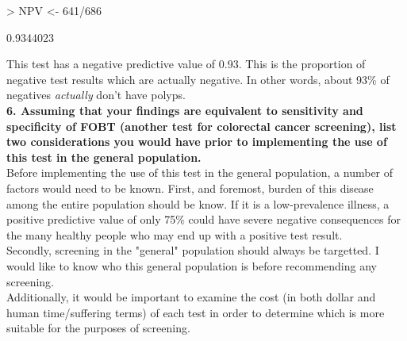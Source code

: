 \documentclass[12pt]{article}
\begin{document}
\begin{Schunk}
\begin{Sinput}
> NPV <- 641/686
\end{Sinput}
\begin{Soutput}
[1] 0.9344023
\end{Soutput}
\end{Schunk}

This test has a negative predictive value of 0.93.  This is the proportion of negative test results which are actually negative.  In other words, about 93\% of negatives \emph{actually} don't have polyps.\\

\noindent \textbf{6. Assuming that your findings are equivalent to sensitivity and specificity of FOBT (another test for colorectal cancer screening), list two considerations you would have prior to implementing the use of this test in the general population.} \\

Before implementing the use of this test in the general population, a number of factors would need to be known.  First, and foremost, burden of this disease among the entire population should be know.  If it is a low-prevalence illness, a positive predictive value of only 75\% could have severe negative consequences for the many healthy people who may end up with a positive test result. \\

Secondly, screening in the "general" population should always be targetted.  I would like to know who this general population is before recommending any screening. \\

Additionally, it would be important to examine the cost (in both dollar and human time/suffering terms) of each test in order to determine which is more suitable for the purposes of screening.  
\end{document}
